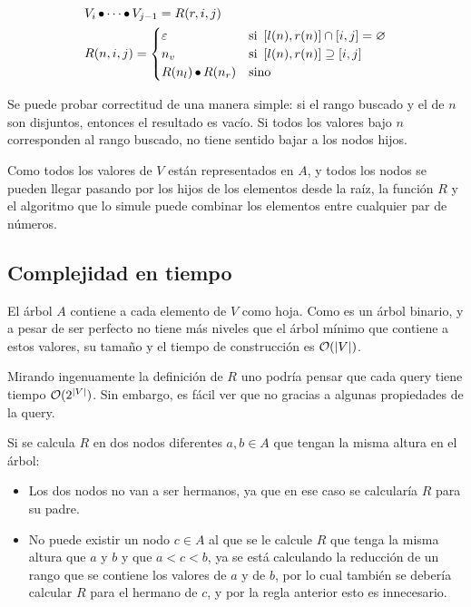 \[
\begin{split}
	& V_i \operatorname{\bullet} \cdots \operatorname{\bullet} V_{j - 1} = R(r, i, j) \\
	& R(n, i, j) =
	\begin{cases}
		\mathbf{\varepsilon} &\text{si } \left[l(n), r(n)\right] \cap \left[i, j\right] = \varnothing \\
		n_v &\text{si } \left[l(n), r(n)\right] \supseteq \left[i, j\right] \\
		R(n_l) \operatorname{\bullet} R(n_r) &\text{sino}
	\end{cases}
\end{split}
\]

Se puede probar correctitud de una manera simple: si el rango buscado y el de \(n\) son disjuntos, entonces el resultado es vacío. Si todos los valores bajo \(n\) corresponden al rango buscado, no tiene sentido bajar a los nodos hijos.

Como todos los valores de \(V\) están representados en \(A\), y todos los nodos se pueden llegar pasando por los hijos de los elementos desde la raíz, la función \(R\) y el algoritmo que lo simule puede combinar los elementos entre cualquier par de números.

\subsection{Complejidad en tiempo}

El árbol \(A\) contiene a cada elemento de \(V\) como hoja. Como es un árbol binario, y a pesar de ser perfecto no tiene más niveles que el árbol mínimo que contiene a estos valores, su tamaño y el tiempo de construcción es \(\mathcal{O}(\left|V\right|)\).

Mirando ingenuamente la definición de \(R\) uno podría pensar que cada query tiene tiempo \(\mathcal{O}(2^{\left|V\right|})\). Sin embargo, es fácil ver que no gracias a algunas propiedades de la query.

Si se calcula \(R\) en dos nodos diferentes \(a, b \in A\) que tengan la misma altura en el árbol:
\begin{itemize}
	\item Los dos nodos no van a ser hermanos, ya que en ese caso se calcularía \(R\) para su padre.
	\item No puede existir un nodo \(c \in A\) al que se le calcule \(R\) que tenga la misma altura que \(a\) y \(b\) y que \(a < c < b\), ya se está calculando la reducción de un rango que se contiene los valores de \(a\) y de \(b\), por lo cual también se debería calcular \(R\) para el hermano de \(c\), y por la regla anterior esto es innecesario.
\end{itemize}

